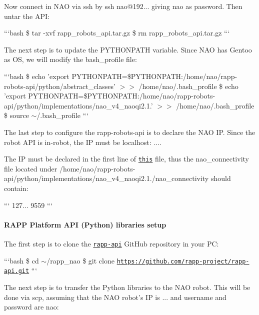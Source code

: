 Now connect in N\-A\-O via ssh by {\ttfamily ssh nao@192...} giving {\ttfamily nao} as password. Then untar the A\-P\-I\-:

```bash \$ tar -\/xvf rapp\-\_\-robots\-\_\-api.\-tar.\-gz \$ rm rapp\-\_\-robots\-\_\-api.\-tar.\-gz ```

The next step is to update the {\ttfamily P\-Y\-T\-H\-O\-N\-P\-A\-T\-H} variable. Since N\-A\-O has Gentoo as O\-S, we will modify the {\ttfamily bash\-\_\-profile} file\-:

```bash \$ echo 'export P\-Y\-T\-H\-O\-N\-P\-A\-T\-H=\$\-P\-Y\-T\-H\-O\-N\-P\-A\-T\-H\-:/home/nao/rapp-\/robots-\/api/python/abstract\-\_\-classes' $>$$>$ /home/nao/.bash\-\_\-profile \$ echo 'export P\-Y\-T\-H\-O\-N\-P\-A\-T\-H=\$\-P\-Y\-T\-H\-O\-N\-P\-A\-T\-H\-:/home/nao/rapp-\/robots-\/api/python/implementations/nao\-\_\-v4\-\_\-naoqi2.1.' $>$$>$ /home/nao/.bash\-\_\-profile \$ source $\sim$/.bash\-\_\-profile ```

The last step to configure the {\ttfamily rapp-\/robots-\/api} is to declare the N\-A\-O I\-P. Since the robot A\-P\-I is in-\/robot, the I\-P must be localhost\-: {...}.

The I\-P must be declared in the first line of \href{https://github.com/rapp-project/rapp-robots-api/blob/master/python/implementations/nao_v4_naoqi2.1.4/nao_connectivity}{\tt this} file, thus the {\ttfamily nao\-\_\-connectivity} file located under {\ttfamily /home/nao/rapp-\/robots-\/api/python/implementations/nao\-\_\-v4\-\_\-naoqi2.1./nao\-\_\-connectivity} should contain\-:

``` 127... 9559 ```

\paragraph*{R\-A\-P\-P Platform A\-P\-I (Python) libraries setup}

The first step is to clone the \href{https://github.com/rapp-project/rapp-api}{\tt rapp-\/api} Git\-Hub repository in your P\-C\-:

```bash \$ cd $\sim$/rapp\-\_\-nao \$ git clone \href{https://github.com/rapp-project/rapp-api.git}{\tt https\-://github.\-com/rapp-\/project/rapp-\/api.\-git} ```

The next step is to transfer the Python libraries to the N\-A\-O robot. This will be done via {\ttfamily scp}, assuming that the N\-A\-O robot's I\-P is {...} and username and password are {\ttfamily nao}\-:

